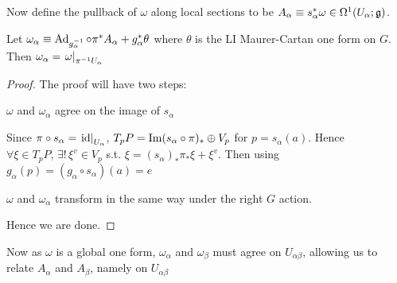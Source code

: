 \documentclass{article}
\begin{document}
Now define the pullback of $\omega$ along local sections to be $A_\alpha \equiv s_\alpha^\ast \omega \in \Omega^1(U_\alpha;\mathfrak{g})$. 
\begin{prop}
Let $\omega_\alpha \equiv \operatorname{Ad}_{g_\alpha^{-1}} \circ \pi^\ast A_\alpha + g_\alpha^\ast \theta $ where $\theta$ is the LI Maurer-Cartan one form on $G$. Then $\omega_\alpha = \left. \omega \right\rvert_{\pi^{-1}U_\alpha}$
\end{prop}
\begin{proof}
The proof will have two steps:
\begin{claim}
$\omega$ and $\omega_\alpha$ agree on the image of $s_\alpha$
\end{claim}
Since $\pi\circ s_\alpha = \left. \operatorname{id} \right\rvert_{U_\alpha}$, $T_pP = \operatorname{Im}(s_\alpha \circ \pi)_\ast \oplus V_p$ for $p = s_\alpha(a)$. Hence $\forall \xi \in T_pP, \, \exists! \, \xi^v \in V_p $ s.t. $\xi = (s_\alpha)_\ast \pi_\ast \xi + \xi^v$. Then using $g_\alpha(p) = (g_\alpha \circ s_\alpha)(a) = e$
\begin{claim}
$\omega$ and $\omega_\alpha$ transform in the same way under the right $G$ action. 
\end{claim}
Hence we are done. 
\end{proof}

Now as $\omega$ is a global one form, $\omega_\alpha$ and $\omega_\beta$ must agree on $U_{\alpha\beta}$, allowing us to relate $A_\alpha$ and $A_\beta$, namely on $U_{\alpha\beta}$
\end{document}
